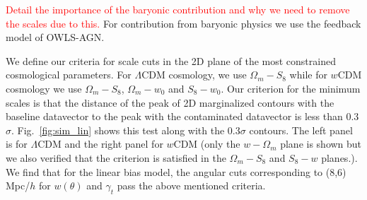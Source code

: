 \documentclass[fleqn,usenatbib]{mnras}
\newcommand{\lcdm}{$\Lambda$CDM}
\newcommand{\wcdm}{$w$CDM}
\newcommand{\red}[1]{\textcolor{red}{#1}}
\begin{document}
\red{Detail the importance of the baryonic contribution and why we need to remove the scales due to this. }
For contribution from baryonic physics  we use the feedback model of OWLS-AGN.

We define our criteria for  scale cuts in the 2D plane of the most constrained cosmological parameters. For $\Lambda$CDM cosmology, we use $\Omega_m - S_8$ while for $w$CDM cosmology we use $\Omega_m-S_8$, $\Omega_m-w_0$ and $S_8-w_0$. Our criterion for the minimum scales is that the distance of the peak of 2D marginalized contours with the baseline datavector to the peak with the contaminated datavector is less than 0.3$\sigma$. Fig.~\ref{fig:sim_lin} shows this test along with the 0.3$\sigma$ contours. The left panel is for $\Lambda$CDM and the right panel for $w$CDM (only the $w- \Omega_m$ plane is shown but we also verified that the  criterion is satisfied in the $\Omega_m-S_8$ and $S_8-w$  planes.). We find that for the linear bias model, the angular cuts corresponding to (8,6) Mpc/$h$ for $w(\theta)$ and $\gamma_t$ pass the above mentioned criteria. 


\end{document}
